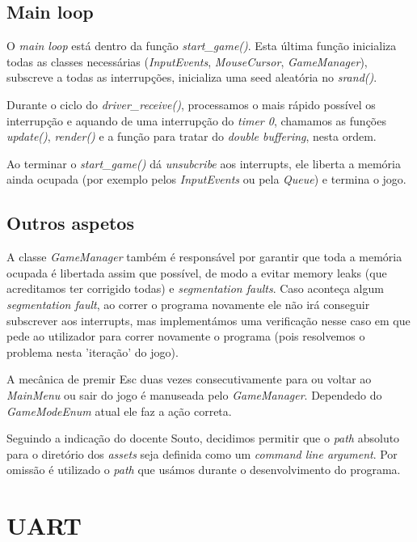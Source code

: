 \documentclass{report}
\begin{document}
\subsection{Main loop}

O \textit{main loop} está dentro da função \textit{start\_game()}. Esta última função inicializa todas as classes necessárias (\textit{InputEvents}, \textit{MouseCursor}, \textit{GameManager}), subscreve a todas as interrupções, inicializa uma seed aleatória no \textit{srand()}.

Durante o ciclo do \textit{driver\_receive()}, processamos o mais rápido possível os interrupção e aquando de uma interrupção do \textit{timer 0}, chamamos as funções \textit{update()}, \textit{render()} e a função para tratar do \textit{double buffering}, nesta ordem.

Ao terminar o \textit{start\_game()} dá \textit{unsubcribe} aos interrupts, ele liberta a memória ainda ocupada (por exemplo pelos \textit{InputEvents} ou pela \textit{Queue}) e termina o jogo.

\subsection{Outros aspetos}

A classe \textit{GameManager} também é responsável por garantir que toda a memória ocupada é libertada assim que possível, de modo a evitar memory leaks (que acreditamos ter corrigido todas) e \textit{segmentation faults}. Caso aconteça algum \textit{segmentation fault}, ao correr o programa novamente ele não irá conseguir subscrever aos interrupts, mas implementámos uma verificação nesse caso em que pede ao utilizador para correr novamente o programa (pois resolvemos o problema nesta 'iteração' do jogo).

A mecânica de premir Esc duas vezes consecutivamente para ou voltar ao \textit{MainMenu} ou sair do jogo é manuseada pelo \textit{GameManager}. Dependedo do \textit{GameModeEnum} atual ele faz a ação correta.

Seguindo a indicação do docente Souto, decidimos permitir que o \textit{path} absoluto para o diretório dos \textit{assets} seja definida como um \textit{command line argument}. Por omissão é utilizado o \textit{path} que usámos durante o desenvolvimento do programa.

\section{UART}
\end{document}
